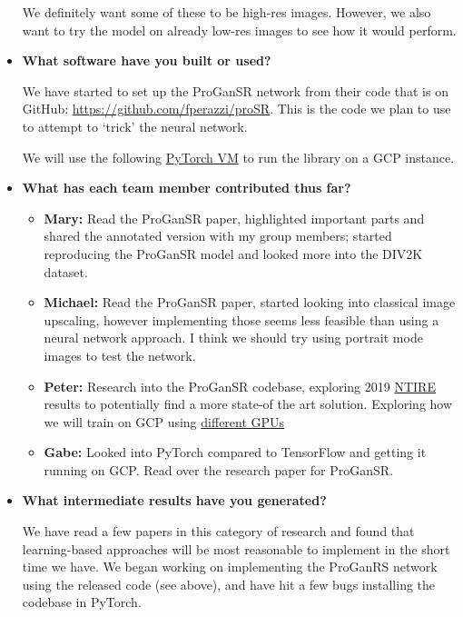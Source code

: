 \begin{itemize}
  We definitely want some of these to be high-res images. However, we also want to try the model on already low-res images to see how it would perform.
  
  \item \textbf{What software have you built or used?}
  
  We have started to set up the ProGanSR network from their code that is on GitHub: \url{https://github.com/fperazzi/proSR}. This is the code we plan to use to attempt to `trick' the neural network.
  
  We will use the following \href{https://cloud.google.com/deep-learning-vm/docs/pytorch_start_instance}{PyTorch VM} to run the library on a GCP instance. 
  
  \item \textbf{What has each team member contributed thus far?}
  \begin{itemize}
      \item \textbf{Mary:} Read the ProGanSR paper, highlighted important parts and shared the annotated version with my group members; started reproducing the ProGanSR model and looked more into the DIV2K dataset.
      \item \textbf{Michael:} Read the ProGanSR paper, started looking into classical image upscaling, however implementing those seems less feasible than using a neural network approach. I think we should try using portrait mode images to test the network.
      \item \textbf{Peter:} Research into the ProGanSR codebase, exploring 2019 \href{https://competitions.codalab.org/competitions/21439#results}{NTIRE} results to potentially find a more state-of the art solution. Exploring how we will train on GCP using \href{https://github.com/fperazzi/proSR/issues/22}{different GPUs} 
      \item \textbf{Gabe:} Looked into PyTorch compared to TensorFlow and getting it running on GCP. Read over the research paper for ProGanSR. 
  \end{itemize}
  
  
  \item \textbf{What intermediate results have you generated?}
  
  We have read a few papers in this category of research and found that learning-based approaches will be most reasonable to implement in the short time we have. We began working on implementing the ProGanRS network using the released code (see above), and have hit a few bugs installing the codebase in PyTorch. 
  

\end{itemize}
